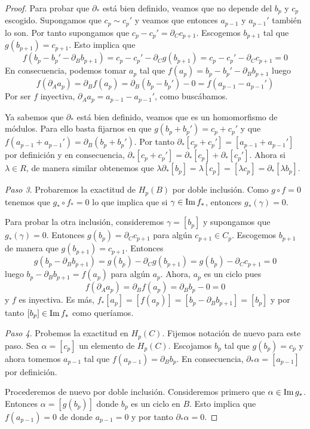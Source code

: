\begin{proof}
	Para probar que $\partial_*$ está bien definido, veamos que no depende del $b_p$ y $c_p$ escogido. Supongamos que $c_p \sim c_p'$ y veamos que entonces $a_{p-1}$ y $a_{p-1}'$ también lo son. Por tanto supongamos que $c_p - c_p' = \partial_C c_{p+1}$. Escogemos $b_{p+1}$ tal que $g(b_{p+1}) = c_{p+1}$. Esto implica que 
	\[
	f(b_p - b_p' - \partial_B b_{p+1}) = c_p - c_p' - \partial_C g(b_{p+1}) = c_p - c_p' - \partial_C c_{p+1} = 0
	\]
	En consecuencia, podemos tomar $a_p$ tal que $f(a_p) = b_p - b_p' - \partial_B b_{p+1}$ luego
	\[
		f(\partial_A a_p) = \partial_B f(a_p) = \partial_B (b_p - b_p') - 0 = f(a_{p-1} - a_{p-1}')
	\]
	Por ser $f$ inyectiva, $\partial_A a_p = a_{p-1} - a_{p-1}'$, como buscábamos.
	
	Ya sabemos que $\partial_*$ está bien definido, veamos que es un homomorfismo de módulos. Para ello basta fijarnos en que $g(b_p + b_p') = c_p + c_p'$ y que $f(a_{p-1}+ a_{p-1}') = \partial_B(b_p+ b_p')$. Por tanto $\partial_* [c_p + c_p'] = [a_{p-1} + a_{p-1}']$ por definición y en consecuencia, $\partial_* [c_p + c_p'] = \partial_*[c_{p}] + \partial_*[c_{p}']$. Ahora si $\lambda \in R$, de manera similar obtenemos que $\lambda \partial_*[b_p] = \lambda [c_p] = [ \lambda c_p ] = \partial_* [ \lambda b_p ]$.
	
	\textit{Paso 3}. Probaremos la exactitud de $H_p(B)$ por doble inclusión. Como $g \circ f = 0$ tenemos que $g_* \circ f_* = 0$ lo que implica que si $\gamma \in \operatorname{Im} f_*$, entonces $g_*(\gamma) = 0$.
	
	Para probar la otra inclusión, consideremos $\gamma = [b_p]$ y supongamos que $g_*(\gamma) = 0$. Entonces $g(b_p) = \partial_C c_{p+1}$ para algún $c_{p+1} \in C_p$. Escogemos $b_{p+1}$ de manera que $g(b_{p+1}) = c_{p+1}$. Entonces
	\[
		g(b_p - \partial_B b_{p+1}) = g(b_p) - \partial_C g(b_{p+1}) = g(b_p) - \partial_C c_{p+1} = 0
	\]
	luego $b_p - \partial_B b_{p+1} = f(a_p)$ para algún $a_p$. Ahora, $a_p$ es un ciclo pues
	\[
		f(\partial_A a_p) = \partial_B f(a_p) = \partial_B b_p - 0 = 0 
	\] 
	y $f$ es inyectiva. Es más, $f_*[a_p] = [f(a_p)] = [b_p - \partial_B b_{p+1}] = [b_p]$ y por tanto $[b_p] \in \operatorname{Im} f_*$ como queríamos.
	
	\textit{Paso 4}. Probemos la exactitud en $H_p(C)$. Fijemos notación de nuevo para este paso. Sea $\alpha = [c_p]$ un elemento de $H_p(C)$. Escojamos $b_p$ tal que $g(b_p) = c_p$ y ahora tomemos $a_{p-1}$ tal que $f(a_{p-1}) = \partial_B b_p$. En consecuencia, $\partial_*\alpha = [a_{p-1}]$ por definición.
	
	Procederemos de nuevo por doble inclusión. Consideremos primero que $\alpha \in \operatorname{Im} g_*$. Entonces $\alpha = [g(b_p)]$ donde $b_p$ es un ciclo en $B$. Esto implica que $f(a_{p-1}) = 0$ de donde $a_{p-1} = 0$ y por tanto $\partial_* \alpha = 0$.
	

\end{proof}
